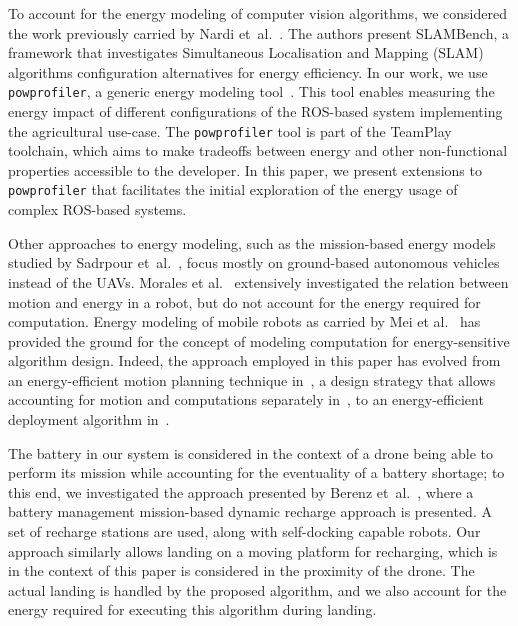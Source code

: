 \documentclass[conference, onecolumn, draftclsnofoot]{IEEEtran}
\newcommand{\stt}[1]{{\small\tt #1}} %
\newcommand{\powprof}{\stt{powprofiler}}
\begin{document}



%
To account for the energy modeling of computer vision algorithms, we
considered the work previously carried by Nardi
et~al.~\cite{nardi2015introducing}. The authors present SLAMBench, a
framework that investigates Simultaneous Localisation and Mapping (SLAM) algorithms configuration alternatives
for energy efficiency. In our work, we use \powprof{}, a generic energy
modeling tool~\cite{seewald2019coarse}. This tool enables measuring
the energy impact of different configurations of the ROS-based system
implementing the agricultural use-case.
The \powprof{} tool is part of the TeamPlay toolchain, which aims to make tradeoffs between energy and other non-functional properties accessible to the developer. 
In this paper, we present
extensions to \powprof{} that facilitates the initial exploration of
the energy usage of complex ROS-based systems.


Other approaches to energy modeling, such as the mission-based energy
models studied by Sadrpour et~al.~\cite{sadrpour2013experimental,
  sadrpour2013mission}, focus mostly on ground-based autonomous
vehicles instead of the UAVs. Morales et al.~\cite{morales2009power}
extensively investigated the relation between motion and energy in a
robot, but do not account for the energy required for computation.
%
Energy modeling of mobile robots as carried by Mei et
al.~\cite{mei2006deployment, mei2005case, mei2004energy} has provided
the ground for the concept of modeling computation for
energy-sensitive algorithm design. Indeed, the approach employed in this paper has evolved
from an energy-efficient motion planning technique
in~\cite{mei2004energy}, a design strategy that allows accounting for
motion and computations separately in~\cite{mei2005case}, to an
energy-efficient deployment algorithm in~\cite{mei2006deployment}.


The battery in our system is considered in the context of a drone
being able to perform its mission while accounting for the eventuality
of a battery shortage; to this end, we investigated the approach
presented by Berenz et~al.~\cite{berenz2012autonomous}, where a
battery management mission-based dynamic recharge approach is
presented. A set of recharge stations are used, along with
self-docking capable robots. Our approach similarly allows landing on
a moving platform for recharging, which is in the context of this
paper is considered in the proximity of the drone. The actual landing
is handled by the proposed algorithm, and we also account for the
energy required for executing this algorithm during landing.
%
\end{document}
